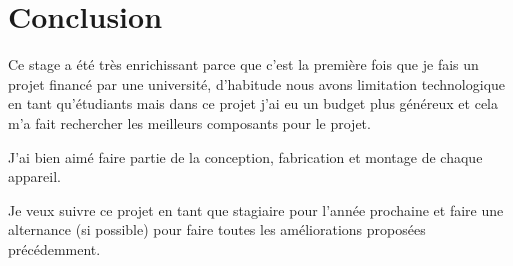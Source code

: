 \documentclass[12pt]{article}
\begin{document}


\section{Conclusion}
\begin{par}
 Ce stage a été très enrichissant parce que c'est la première fois que je fais un projet financé par une université, d'habitude nous avons limitation technologique en tant qu'étudiants mais dans ce projet j'ai eu un budget plus généreux et cela m'a fait rechercher les meilleurs composants pour le projet.
\end{par}
\begin{par}
 J'ai bien aimé faire partie de la conception, fabrication et montage de chaque appareil.
\end{par}
\begin{par}
	Je veux suivre ce projet en tant que stagiaire pour 	l'année prochaine et faire une alternance (si possible) 	pour faire toutes les améliorations proposées précédemment.
\end{par}

%

%




%

%
\end{document}
